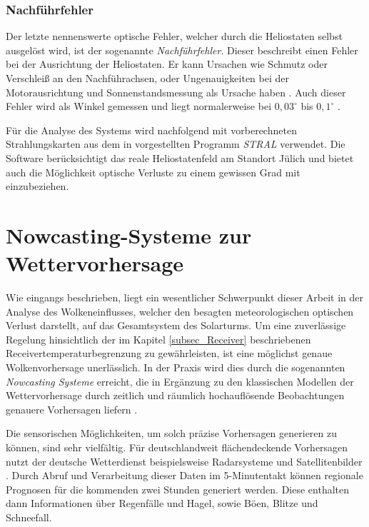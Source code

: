 \subsubsection*{Nachführfehler} \label{subsubsec_Nachführfehler}
Der letzte nennenswerte optische Fehler, welcher durch die Heliostaten selbst ausgelöst wird, ist der sogenannte \textit{Nachführfehler}.
Dieser beschreibt einen Fehler bei der Ausrichtung der Heliostaten.
Er kann Ursachen wie Schmutz oder Verschleiß an den Nachführachsen, oder Ungenauigkeiten bei der Motorausrichtung und Sonnenstandsmessung als Ursache haben \cite[S.7]{Richter}. Auch dieser Fehler wird als Winkel gemessen und liegt normalerweise bei $0,03^\circ$ bis $0,1^\circ$ \cite[S.17]{DissBelhomme}.

Für die Analyse des Systems wird nachfolgend mit vorberechneten Strahlungskarten aus dem in \cite[S.53ff]{DissBelhomme} vorgestellten Programm \textit{STRAL} verwendet.
Die Software berücksichtigt das reale Heliostatenfeld am Standort Jülich und bietet auch die Möglichkeit optische Verluste zu einem gewissen Grad mit einzubeziehen.


\section{Nowcasting-Systeme zur Wettervorhersage} \label{sec_Nowcasting}
Wie eingangs beschrieben, liegt ein wesentlicher Schwerpunkt dieser Arbeit in der Analyse des Wolkeneinflusses, welcher den besagten meteorologischen optischen Verlust darstellt, auf das Gesamtsystem des Solarturms.
Um eine zuverlässige Regelung hinsichtlich der im Kapitel \ref{subsec_Receiver} beschriebenen Receivertemperaturbegrenzung zu gewährleisten, ist eine möglichst genaue Wolkenvorhersage unerlässlich.
In der Praxis wird dies durch die sogenannten \textit{Nowcasting Systeme} erreicht, die in Ergänzung zu den klassischen Modellen der Wettervorhersage durch zeitlich und räumlich hochauflösende Beobachtungen genauere Vorhersagen liefern \cite{DWD1}.

Die sensorischen Möglichkeiten, um solch präzise Vorhersagen generieren zu können, sind sehr vielfältig.
Für deutschlandweit flächendeckende Vorhersagen nutzt der deutsche Wetterdienst beispielsweise Radarsysteme und Satellitenbilder \cite{DWD1}.
Durch Abruf und Verarbeitung dieser Daten im 5-Minutentakt können regionale Prognosen für die kommenden zwei Stunden generiert werden.
Diese enthalten dann Informationen über Regenfälle und Hagel, sowie Böen, Blitze und Schneefall.

